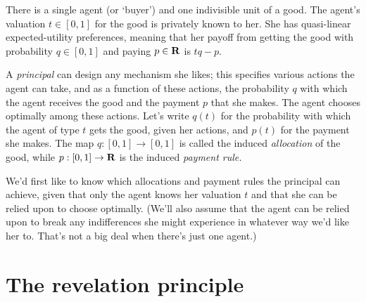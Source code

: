 






There is a single agent (or `buyer') and one indivisible unit of a good.
The agent's valuation $t \in [0,1]$ for the good is privately known to her.
She has quasi-linear expected-utility preferences, meaning that her payoff from getting the good with probability $q \in [0,1]$ and paying $p \in \mathbf{R}$ is $t q - p$.

A \emph{principal} can design any mechanism she likes;
this specifies various actions the agent can take,
and as a function of these actions, the probability $q$ with which the agent receives the good and the payment $p$ that she makes.
The agent chooses optimally among these actions.
Let's write $q(t)$ for the probability with which the agent of type $t$ gets the good, given her actions, and $p(t)$ for the payment she makes.
The map $q : [0,1] \to [0,1]$ is called the induced \emph{allocation} of the good, while $p : [0,1] \to \mathbf{R}$ is the induced \emph{payment rule.}

We'd first like to know which allocations and payment rules the principal can achieve,
given that only the agent knows her valuation $t$ and that she can be relied upon to choose optimally.
(We'll also assume that the agent can be relied upon to break any indifferences she might experience in whatever way we'd like her to. That's not a big deal when there's just one agent.)



\section{The revelation principle}
\label{sec:ch1:revelation}

